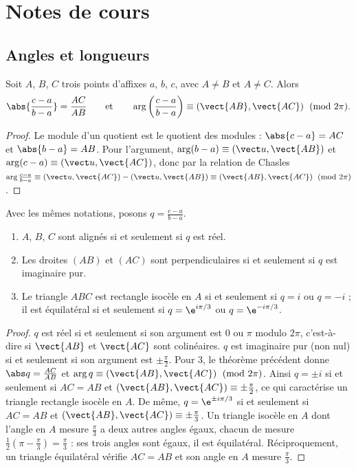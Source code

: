 \mxnewpage
\section{Notes de cours}
\subsection{Angles et longueurs}
\begin{theorem}
Soit $A$, $B$, $C$ trois points d'affixes $a$, $b$, $c$, avec $A\neq B$ et $A\neq C$. Alors
\[\abs{\frac{c-a}{b-a}}=\frac{AC}{AB}\qquad\text{et}\qquad\arg\left(\frac{c-a}{b-a}\right)\equiv\left(\vect{AB},\vect{AC}\right)\pmod{2\pi}.\]
\end{theorem}
\begin{proof}
Le module d'un quotient est le quotient des modules : $\abs{c-a}=AC$ et $\abs{b-a}=AB$. Pour l'argument, $\arg(b-a)\equiv\left(\vect u,\vect{AB}\right)$ et $\arg(c-a)\equiv\left(\vect u,\vect{AC}\right)$, donc par la relation de Chasles $\arg\frac{c-a}{b-a}\equiv\left(\vect u,\vect{AC}\right)-\left(\vect u,\vect{AB}\right)\equiv\left(\vect{AB},\vect{AC}\right)\pmod{2\pi}$.
\end{proof}
\begin{theorem}
Avec les mêmes notations, posons $q=\frac{c-a}{b-a}$.
\begin{enumerate}
\item $A$, $B$, $C$ sont alignés si et seulement si $q$ est réel.
\item Les droites $(AB)$ et $(AC)$ sont perpendiculaires si et seulement si $q$ est imaginaire pur.
\item Le triangle $ABC$ est rectangle isocèle en $A$ si et seulement si $q=i$ ou $q=-i$ ; il est équilatéral si et seulement si $q=\e^{i\pi/3}$ ou $q=\e^{-i\pi/3}$.
\end{enumerate}
\end{theorem}
\begin{proof}
$q$ est réel si et seulement si son argument est $0$ ou $\pi$ modulo $2\pi$, c'est-à-dire si $\vect{AB}$ et $\vect{AC}$ sont colinéaires. $q$ est imaginaire pur (non nul) si et seulement si son argument est $\pm\frac\pi2$. Pour 3, le théorème précédent donne $\abs q=\frac{AC}{AB}$ et $\arg q\equiv\left(\vect{AB},\vect{AC}\right)\pmod{2\pi}$. Ainsi $q=\pm i$ si et seulement si $AC=AB$ et $\left(\vect{AB},\vect{AC}\right)\equiv\pm\frac\pi2$, ce qui caractérise un triangle rectangle isocèle en $A$. De même, $q=\e^{\pm i\pi/3}$ si et seulement si $AC=AB$ et $\left(\vect{AB},\vect{AC}\right)\equiv\pm\frac\pi3$. Un triangle isocèle en $A$ dont l'angle en $A$ mesure $\frac\pi3$ a deux autres angles égaux, chacun de mesure $\frac12\left(\pi-\frac\pi3\right)=\frac\pi3$ : ses trois angles sont égaux, il est équilatéral. Réciproquement, un triangle équilatéral vérifie $AC=AB$ et son angle en $A$ mesure $\frac\pi3$.
\end{proof}
